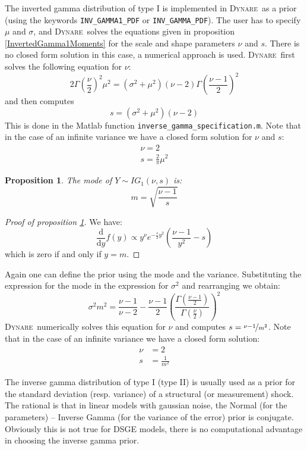 \documentclass{amsart}
\theoremstyle{plain}
\newtheorem{proposition}{Proposition}[section]
\theoremstyle{remark}
\numberwithin{equation}{section}
\newcommand{\Dynare}{\textsc{Dynare}}
\begin{document}
The inverted gamma distribution of type I is implemented in \Dynare\
as a prior (using the keywords \verb+INV_GAMMA1_PDF+ or
\verb+INV_GAMMA_PDF+). The user has to specify $\mu$ and $\sigma$, and
\Dynare\ solves the equations given in proposition
\ref{InvertedGamma1Moments} for the scale and shape parameters $\nu$
and $s$. There is no closed form solution in this case, a numerical
approach is used. \Dynare\ first solves the following equation for $\nu$:
\[
2\Gamma\left(\frac{\nu}{2}\right)^2\mu^2 = (\sigma^2 + \mu^2)(\nu-2)\Gamma\left(\frac{\nu-1}{2}\right)^2
\]
and then computes
\[
s = (\sigma^2 + \mu^2)(\nu-2)
\]
This is done in the Matlab function \verb+inverse_gamma_specification.m+. Note that in the case
of an infinite variance we have a closed form solution for $\nu$ and $s$:
\[
  \begin{split}
    \nu = 2\\
    s = \frac{2}{\pi}\mu^2
  \end{split}
\]

\begin{proposition}\label{InvertedGamma1Mode}
  The mode of $Y\sim IG_1(\nu, s)$ is:
  \[
    m = \sqrt{\frac{\nu-1}{s}}
  \]
\end{proposition}

\begin{proof}[Proof of proposition \ref{InvertedGamma1Mode}]
  We have:
  \[
    \frac{\mathrm d}{\mathrm d y} f(y) \propto y^{\nu}e^{-\frac{s}{2}y^2}\left(\frac{\nu-1}{y^2}-s\right)
  \]
  which is zero if and only if $y = m$.
\end{proof}

Again one can define the prior using the mode and the
variance. Substituting the expression for the mode in the expression
for $\sigma^2$ and rearranging we obtain:
\[
\sigma^2m^2 = \frac{\nu-1}{\nu-2} - \frac{\nu-1}{2} \left(\frac{\Gamma\left(\frac{\nu-1}{2}\right)}{\Gamma\left(\frac{\nu}{2}\right)}\right)^2
\]
\Dynare\ numerically solves this equation for $\nu$ and computes
$s = \nicefrac{\nu-1}{m^2}$. Note that in the case of an infinite
variance we have a closed form solution:
\[
  \begin{split}
    \nu &= 2\\
    s &= \frac{1}{m^2}
  \end{split}
\]

The inverse gamma distribution of type I (type II) is usually used as
a prior for the standard deviation (resp. variance) of a structural
(or measurement) shock. The rational is that in linear models with
gaussian noise, the Normal (for the parameters) – Inverse Gamma
(for the variance of the error) prior is conjugate. Obviously this is
not true for DSGE models, there is no computational advantage in
choosing the inverse gamma prior.
\end{document}

